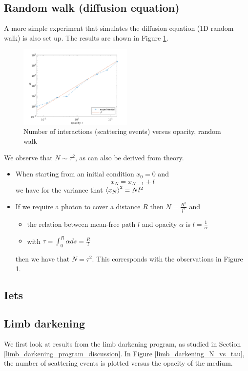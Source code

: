 \documentclass[../main/main.tex]{subfiles}
\begin{document}
\subsection{Random walk (diffusion equation)} A more simple experiment that simulates the diffusion equation (1D random walk) is also set up. The results are shown in Figure \ref{random_walk_N_vs_tau}.
	\begin{figure}[!htp]
	\centering
	\includegraphics[width=0.5\textwidth]{../../introductory_exercises/limb_darkening/data/diff_N_vs_opacity.png}
	\caption{Number of interactions (scattering events) versus 	opacity, random walk}
	\label{random_walk_N_vs_tau}
	\end{figure}
We observe that $N \sim \tau^2$, as can also be derived from theory.

\begin{itemize}
\item When starting from an initial condition $x_0 = 0$ and 
\begin{equation}
x_N = x_{N-1} \pm l
\end{equation}
we have for the variance that $\braket{x_N}^2 = N l^2$ 
\item If we require a photon to cover a distance $R$ then $N = \frac{R^2}{l^2}$ and
\begin{itemize}
\item the relation between mean-free path $l$ and opacity $\alpha$ is $l = \frac{1}{\alpha}$
\item with $\tau = \int_0^R \alpha ds = \frac{R}{l}$
\end{itemize}
then we have that $N = \tau^2$. This corresponds with the observations in Figure \ref{random_walk_N_vs_tau}.
\end{itemize}

\newpage
\subsection{Iets}

\newpage
\subsection{Limb darkening} We first look at results from the limb darkening program, as studied in Section \ref{limb_darkening_program_discussion}. In Figure \ref{limb_darkening_N_vs_tau}, the number of scattering events is plotted versus the opacity of the medium. 
\end{document}
